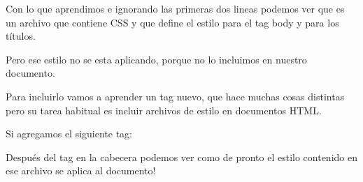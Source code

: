 \documentclass[letterpaper,10pt,spanish]{sphinxmanual}
\begin{document}
%
\begin{sphinxVerbatim}[commandchars=\\\{\}]
 
 

 
   
    
    
   
   
   

 
    
   
\end{sphinxVerbatim}

Con lo que aprendimos e ignorando las primeras dos lineas podemos ver que es un
archivo que contiene CSS y que define el estilo para el tag body y para los
títulos.

Pero ese estilo no se esta aplicando, porque no lo incluimos en nuestro
documento.

Para incluirlo vamos a aprender un tag nuevo, que hace muchas cosas distintas
pero su tarea habitual es incluir archivos de estilo en documentos HTML.

Si agregamos el siguiente tag:

%
\begin{sphinxVerbatim}[commandchars=\\\{\}]
  
\end{sphinxVerbatim}

Después del tag  en la cabecera podemos ver como de pronto el estilo
contenido en ese archivo se aplica al documento!
\end{document}
